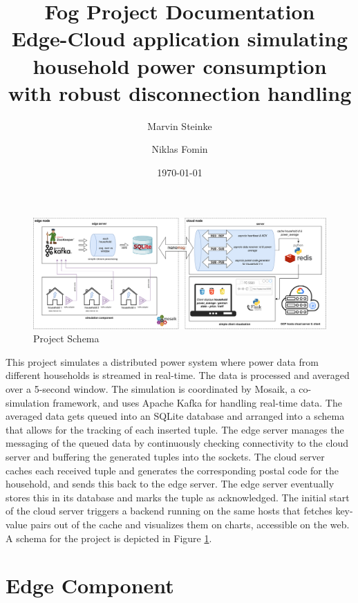 \documentclass[a4paper]{article}
\title{%
    Fog Project Documentation\\[5mm]
    {\normalsize Edge-Cloud application simulating household power
    consumption\\[-2mm] with robust disconnection handling}
}
\author{Marvin Steinke \and Niklas Fomin}
\date{\today}
\begin{document}
\maketitle

\begin{figure}
    \centering
    \includegraphics[width=\linewidth]{../schema/schema}
    \caption{Project Schema}
    \label{fig:project_schema}
\end{figure}

This project simulates a distributed power system where power data from
different households is streamed in real-time. The data is processed and
averaged over a 5-second window. The simulation is coordinated by Mosaik, a
co-simulation framework, and uses Apache Kafka for handling real-time data. The
averaged data gets queued into an SQLite database and arranged into a schema
that allows for the tracking of each inserted tuple. The edge server manages the
messaging of the queued data by continuously checking connectivity to the cloud
server and buffering the generated tuples into the sockets. The cloud server
caches each received tuple and generates the corresponding postal code for the
household, and sends this back to the edge server. The edge server eventually
stores this in its database and marks the tuple as acknowledged. The initial
start of the cloud server triggers a backend running on the same hosts that
fetches key-value pairs out of the cache and visualizes them on charts,
accessible on the web. A schema for the project is depicted in Figure
\ref{fig:project_schema}.

\section{Edge Component}
\end{document}
